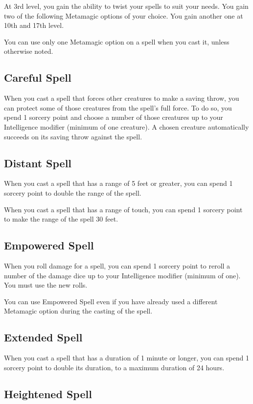 At 3rd level, you gain the ability to twist your spells to suit your needs. You gain two of the following Metamagic options of your choice. You gain another one at 10th and 17th level.

You can use only one Metamagic option on a spell when you cast it, unless otherwise noted.

\subsection{Careful Spell}

When you cast a spell that forces other creatures to make a saving throw, you can protect some of those creatures from the spell's full force. To do so, you spend 1 sorcery point and choose a number of those creatures up to your Intelligence modifier (minimum of one creature). A chosen creature automatically succeeds on its saving throw against the spell.

\subsection{Distant Spell}

When you cast a spell that has a range of 5 feet or greater, you can spend 1 sorcery point to double the range of the spell.

When you cast a spell that has a range of touch, you can spend 1 sorcery point to make the range of the spell 30 feet.

\subsection{Empowered Spell}

When you roll damage for a spell, you can spend 1 sorcery point to reroll a number of the damage dice up to your Intelligence modifier (minimum of one). You must use the new rolls.

You can use Empowered Spell even if you have already used a different Metamagic option during the casting of the spell.

\subsection{Extended Spell}

When you cast a spell that has a duration of 1 minute or longer, you can spend 1 sorcery point to double its duration, to a maximum duration of 24 hours.

\subsection{Heightened Spell}

